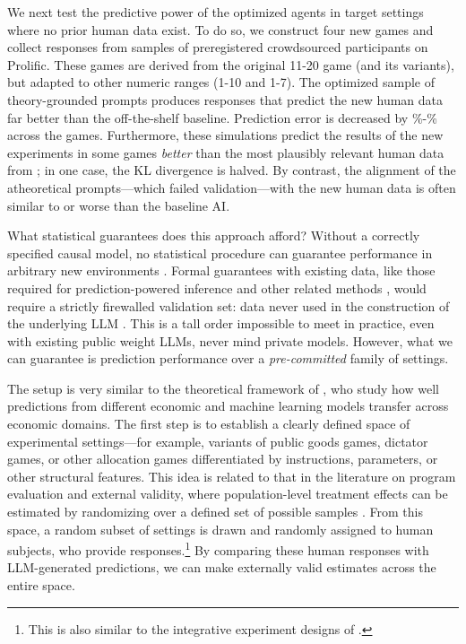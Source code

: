 \documentclass[11pt]{article}
\theoremstyle{definition}
\newcommand{\persona}{prompt}
\begin{document}
We next test the predictive power of the optimized agents in target settings where no prior human data exist.
To do so, we construct four new games and collect responses from samples of preregistered crowdsourced participants \citep{horton2011online} on Prolific. 
These games are derived from the original 11-20 game (and its variants), but adapted to other numeric ranges (1-10 and 1-7).
The optimized sample of theory-grounded \persona{s} produces responses that predict the new human data far better than the off-the-shelf baseline.
Prediction error is decreased by \MinPercImproveArad\%-\MaxPercImproveArad\% across the games.
Furthermore, these simulations predict the results of the new experiments in some games \emph{better} than the most plausibly relevant human data from \citeauthor{1120Arad2012}; in one case, the KL divergence is halved.
By contrast, the alignment of the atheoretical \persona{s}---which failed validation---with the new human data is often similar to or worse than the baseline AI.

What statistical guarantees does this approach afford?
Without a correctly specified causal model, no statistical procedure can guarantee performance in arbitrary new environments \citep{Pearl2009Causality}.  
Formal guarantees with existing data, like those required for prediction-powered inference \citep{Angelopoulos2023Prediction} and other related methods \citep{Egami2023Using,Hardy2025Population}, would require a strictly firewalled validation set: data never used in the construction of the underlying LLM \citep{ludwig2025llmapplied,sarkar2024lookahead,ML2017Sendhil,spiess2025causaltext}.
This is a tall order impossible to meet in practice, even with existing public weight LLMs, never mind private models. 
However, what we can guarantee is prediction performance over a \emph{pre-committed} family of settings. 

The setup is very similar to the theoretical framework of \cite{andrews2025transfer}, who study how well predictions from different economic and machine learning models transfer across economic domains.
The first step is to establish a clearly defined space of experimental settings---for example, variants of public goods games, dictator games, or other allocation games differentiated by instructions, parameters, or other structural features.
This idea is related to that in the literature on program evaluation and external validity, where population-level treatment effects can be estimated by randomizing over a defined set of possible samples \citep{Hotz2005PredictingEfficacy,Allcott2015Site,Dehejia2019External}.
From this space, a random subset of settings is drawn and randomly assigned to human subjects, who provide responses.\footnote{This is also similar to the integrative experiment designs of \cite{20Q2024Almaatouq}.}
By comparing these human responses with LLM-generated predictions, we can make externally valid estimates across the entire space.
\end{document}
